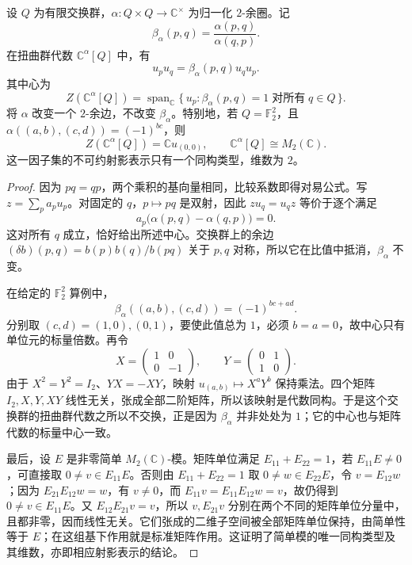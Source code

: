 \begin{proposition}\label{b5:prop:twisted-commutator-center}
	设 \(Q\) 为有限交换群，\(\alpha:Q\times Q\to\mathbb C^\times\) 为归一化 \(2\)-余圈。记
	\[
		\beta_\alpha(p,q)=\frac{\alpha(p,q)}{\alpha(q,p)}.
	\]
	在扭曲群代数 \(\mathbb C^\alpha[Q]\) 中，有
	\[
		u_pu_q=\beta_\alpha(p,q)u_qu_p.
	\]
	其中心为
	\[
		Z(\mathbb C^\alpha[Q]) =\operatorname{span}_{\mathbb C}\{\,u_p:\beta_\alpha(p,q)=1\;\text{对所有}\;q\in Q\,\}.
	\]
	将 \(\alpha\) 改变一个 \(2\)-余边，不改变 \(\beta_\alpha\)。特别地，若 \(Q=\mathbb F_2^2\)，且 \(\alpha((a,b),(c,d))=(-1)^{bc}\)，则
	\[
		Z(\mathbb C^\alpha[Q])=\mathbb C u_{(0,0)},\qquad \mathbb C^\alpha[Q]\cong M_2(\mathbb C).
	\]
	这一因子集的不可约射影表示只有一个同构类型，维数为 \(2\)。
\end{proposition}
\begin{proof}
	因为 \(pq=qp\)，两个乘积的基向量相同，比较系数即得对易公式。写 \(z=\sum_p a_pu_p\)。对固定的 \(q\)，\(p\mapsto pq\) 是双射，因此 \(zu_q=u_qz\) 等价于逐个满足
	\[
		a_p\bigl(\alpha(p,q)-\alpha(q,p)\bigr)=0.
	\]
	这对所有 \(q\) 成立，恰好给出所述中心。交换群上的余边 \((\delta b)(p,q)=b(p)b(q)/b(pq)\) 关于 \(p,q\) 对称，所以它在比值中抵消，\(\beta_\alpha\) 不变。

	在给定的 \(\mathbb F_2^2\) 算例中，
	\[
		\beta_\alpha((a,b),(c,d))=(-1)^{bc+ad}.
	\]
	分别取 \((c,d)=(1,0),(0,1)\)，要使此值总为 \(1\)，必须 \(b=a=0\)，故中心只有单位元的标量倍数。再令
	\[
		X=\begin{pmatrix}1&0\\0&-1\end{pmatrix},\qquad
		Y=\begin{pmatrix}0&1\\1&0\end{pmatrix}.
	\]
	由于 \(X^2=Y^2=I_2\)、\(YX=-XY\)，映射 \(u_{(a,b)}\mapsto X^aY^b\) 保持乘法。四个矩阵 \(I_2,X,Y,XY\) 线性无关，张成全部二阶矩阵，所以该映射是代数同构。于是这个交换群的扭曲群代数之所以不交换，正是因为 \(\beta_\alpha\) 并非处处为 \(1\)；它的中心也与矩阵代数的标量中心一致。

	最后，设 \(E\) 是非零简单 \(M_2(\mathbb C)\)-模。矩阵单位满足 \(E_{11}+E_{22}=1\)，若 \(E_{11}E\ne0\)，可直接取 \(0\ne v\in E_{11}E\)。否则由 \(E_{11}+E_{22}=1\) 取 \(0\ne w\in E_{22}E\)，令 \(v=E_{12}w\)；因为 \(E_{21}E_{12}w=w\)，有 \(v\ne0\)，而 \(E_{11}v=E_{11}E_{12}w=v\)，故仍得到 \(0\ne v\in E_{11}E\)。又 \(E_{12}E_{21}v=v\)，所以 \(v,E_{21}v\) 分别在两个不同的矩阵单位分量中，且都非零，因而线性无关。它们张成的二维子空间被全部矩阵单位保持，由简单性等于 \(E\)；在这组基下作用就是标准矩阵作用。这证明了简单模的唯一同构类型及其维数，亦即相应射影表示的结论。
\end{proof}

